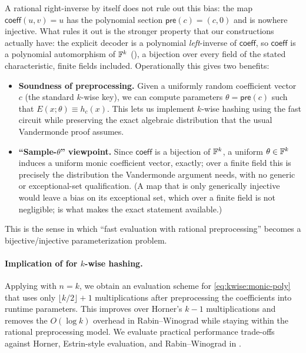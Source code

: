 A rational right-inverse by itself does not rule out this bias: the map
$\mathsf{coeff}(u,v)=u$ has the polynomial section $\mathsf{pre}(c)=(c,0)$
and is nowhere injective.  What rules it out is the stronger property that
our constructions actually have: the explicit decoder is a polynomial
\emph{left}-inverse of $\mathsf{coeff}$, so $\mathsf{coeff}$ is a polynomial
automorphism of $\mathbb{F}^k$ (), a
bijection over every field of the stated characteristic, finite fields
included.
Operationally this gives two benefits:
\begin{itemize}
  \item \textbf{Soundness of preprocessing.}
  Given a uniformly random coefficient vector $c$ (the standard $k$-wise key), we can compute
  parameters $\theta=\mathsf{pre}(c)$ such that $E(x;\theta)\equiv h_c(x)$.
  This lets us implement $k$-wise hashing using the fast circuit while preserving the exact
  algebraic distribution that the usual Vandermonde proof assumes.
  \item \textbf{``Sample-$\theta$'' viewpoint.}
  Since $\mathsf{coeff}$ is a bijection of $\mathbb{F}^k$, a uniform $\theta\in\mathbb{F}^k$
  induces a uniform monic coefficient vector, exactly; over a finite field this
  is precisely the distribution the Vandermonde argument needs, with no generic
  or exceptional-set qualification.  (A map that is only generically injective
  would leave a bias on its exceptional set, which over a finite field is not
  negligible;  is what makes
  the exact statement available.)
\end{itemize}
This is the sense in which ``fast evaluation with rational preprocessing'' becomes a
bijective/injective parameterization problem.

\paragraph{Implication of  for $k$-wise hashing.}
Applying  with $n=k$, we obtain an evaluation scheme for \eqref{eq:kwise:monic-poly}
that uses only $\lfloor k/2\rfloor+1$ multiplications after preprocessing the coefficients into
runtime parameters.
This improves over Horner's $k-1$ multiplications and removes the $O(\log k)$ overhead in
Rabin--Winograd while staying within the rational preprocessing model.
We evaluate practical performance trade-offs against Horner, Estrin-style evaluation, and
Rabin--Winograd in .
